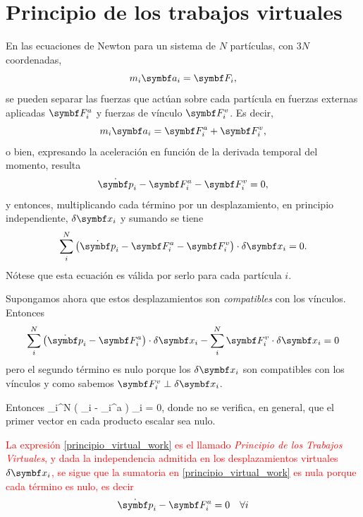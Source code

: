 \documentclass[10pt,oneside]{CBFT_book}
\begin{document}
\section{Principio de los trabajos virtuales}

En las ecuaciones de Newton para un sistema de $N$ partículas, con $3N$ coordenadas,
\[
	m_i \vb{a}_i = \vb{F}_i,
\]
se pueden separar las fuerzas que actúan sobre cada partícula en fuerzas externas aplicadas $ \vb{F}_i^a $
y fuerzas de vínculo $ \vb{F}_i^v $. Es decir,
\[
	m_i \vb{a}_i = \vb{F}_i^a + \vb{F}_i^v,
\]
o bien, expresando la aceleración en función de la derivada temporal del momento, 
resulta 
\[
	\dot{\vb{p}}_i - \vb{F}_i^a - \vb{F}_i^v = 0,
\]
y entonces, multiplicando cada término por un desplazamiento, en principio independiente, $ \delta\vb{x}_i $ y sumando se tiene
\[
	\sum_i^N \left( \dot{\vb{p}}_i - \vb{F}_i^a - \vb{F}_i^v \right) \cdot \delta\vb{x}_i  = 0.
\]
Nótese que esta ecuación es válida por serlo para cada partícula $i$.

Supongamos ahora que estos desplazamientos son {\it compatibles} con los vínculos. Entonces
\[
	\sum_i^N \left( \dot{\vb{p}}_i - \vb{F}_i^a \right) \cdot \delta\vb{x}_i 
	- \sum_i^N  \vb{F}_i^v  \cdot \delta\vb{x}_i  = 0
\]
pero el segundo término es nulo porque los $ \delta\vb{x}_i $ son compatibles con los vínculos y como sabemos 
$ \vb{F}_i^v \perp \delta\vb{x}_i $.

Entonces
\be
	\sum_i^N \left( _i - _i^a \right) \cdot \delta{}_i = 0,
	\label{principio_virtual_work}
\ee
donde no se verifica, en general, que el primer vector en cada producto escalar sea nulo.

\textcolor{red}{
La expresión \eqref{principio_virtual_work} es el llamado {\it Principio de los Trabajos Virtuales},
y dada la independencia admitida en los desplazamientos virtuales $ \delta \vb{x}_i $, se sigue que la
sumatoria en \eqref{principio_virtual_work} es nula porque cada término es nulo, es decir
\[
	\dot{\vb{p}}_i - \vb{F}_i^a = 0 \quad \forall i
\]
}
\end{document}
